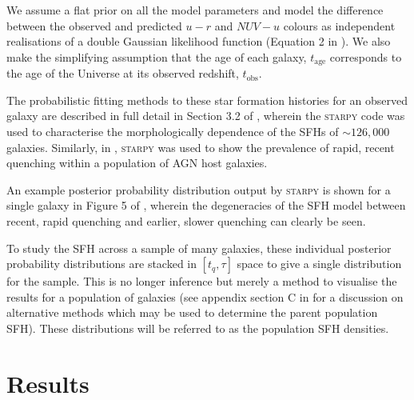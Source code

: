 \documentclass[useAMS,usenatbib]{mn2e}
\begin{document}
We assume a flat prior on all the model parameters and model the difference between the observed and predicted $u-r$ and $NUV-u$ colours as independent realisations of a double Gaussian likelihood function (Equation 2 in \citealt{smethurst15}). We also make the simplifying assumption that the age of each galaxy, $t_\mathrm{age}$ corresponds to the age of the Universe at its observed redshift, $t_\mathrm{obs}$.

The probabilistic fitting methods to these star formation histories for an observed galaxy are described in full detail in Section 3.2 of \cite{smethurst15}, wherein the \textsc{starpy} code was used to characterise the morphologically dependence of the SFHs of $\sim126,000$ galaxies. Similarly, in \cite{smethurst16}, \textsc{starpy} was used to show the prevalence of rapid, recent quenching within a population of AGN host galaxies. 


An example posterior probability distribution output by \textsc{starpy} is shown for a single galaxy in Figure 5 of \cite{smethurst15}, wherein the degeneracies of the SFH model between recent, rapid quenching and earlier, slower quenching can clearly be seen. 

To study the SFH across a sample of many galaxies, these individual posterior probability distributions are stacked in $[t_q, \tau]$ space to give a single distribution for the sample. This is no longer inference but merely a method to visualise the results for a population of galaxies (see appendix section C in \citealt{smethurst16} for a discussion on alternative methods which may be used to determine the parent population SFH). These distributions will be referred to as the population SFH densities.

\section{Results}\label{sec:results}
\end{document}
